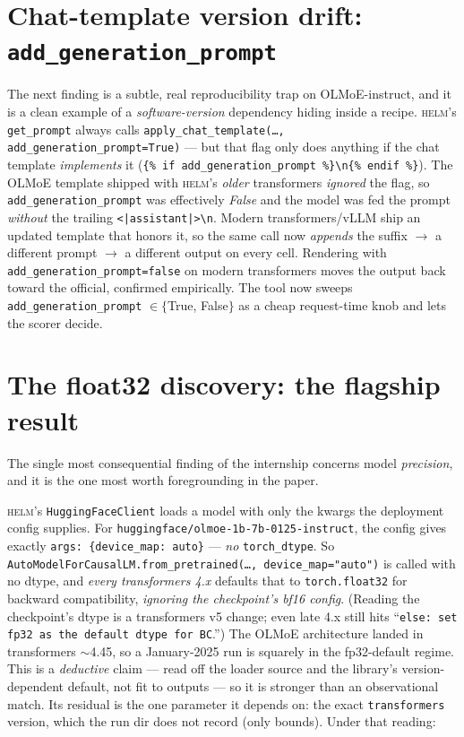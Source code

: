 \documentclass[11pt]{report}
\newcommand{\code}[1]{\texttt{#1}}
\begin{document}
\section{Chat-template version drift: \code{add\_generation\_prompt}}
\label{sec:addgenprompt}

The next finding is a subtle, real reproducibility trap on OLMoE-instruct, and it
is a clean example of a \emph{software-version} dependency hiding inside a recipe.
\textsc{helm}'s \code{get\_prompt} always calls
\code{apply\_chat\_template(\ldots, add\_generation\_prompt=True)} --- but that flag
only does anything if the chat template \emph{implements} it
(\code{\{\% if add\_generation\_prompt \%\}<|assistant|>\textbackslash n\{\% endif \%\}}).
The OLMoE template shipped with \textsc{helm}'s \emph{older} transformers
\emph{ignored} the flag, so \code{add\_generation\_prompt} was effectively
\emph{False} and the model was fed the prompt \emph{without} the trailing
\code{<|assistant|>\textbackslash n}. Modern transformers/vLLM ship an updated
template that honors it, so the same call now \emph{appends} the suffix
$\rightarrow$ a different prompt $\rightarrow$ a different output on every cell.
Rendering with \code{add\_generation\_prompt=false} on modern transformers moves
the output back toward the official, confirmed empirically. The tool now sweeps
\code{add\_generation\_prompt} $\in \{$True, False$\}$ as a cheap request-time knob
and lets the scorer decide.

\section{The float32 discovery: the flagship result}
\label{sec:fp32}

The single most consequential finding of the internship concerns model
\emph{precision}, and it is the one most worth foregrounding in the paper.

\textsc{helm}'s \code{HuggingFaceClient} loads a model with only the kwargs the
deployment config supplies. For \code{huggingface/olmoe-1b-7b-0125-instruct}, the
config gives exactly \code{args: \{device\_map: auto\}} --- \emph{no}
\code{torch\_dtype}. So \code{AutoModelForCausalLM.from\_pretrained(\ldots,
device\_map="auto")} is called with no dtype, and \emph{every transformers 4.x}
defaults that to \code{torch.float32} for backward compatibility, \emph{ignoring
the checkpoint's bf16 config}. (Reading the checkpoint's dtype is a transformers
v5 change; even late 4.x still hits ``\code{else: set fp32 as the default dtype for
BC}.'') The OLMoE architecture landed in transformers $\sim$4.45, so a January-2025
run is squarely in the fp32-default regime. This is a \emph{deductive} claim ---
read off the loader source and the library's version-dependent default, not fit to
outputs --- so it is stronger than an observational match. Its residual is the one
parameter it depends on: the exact \code{transformers} version, which the run dir
does not record (only bounds). Under that reading:
\end{document}
